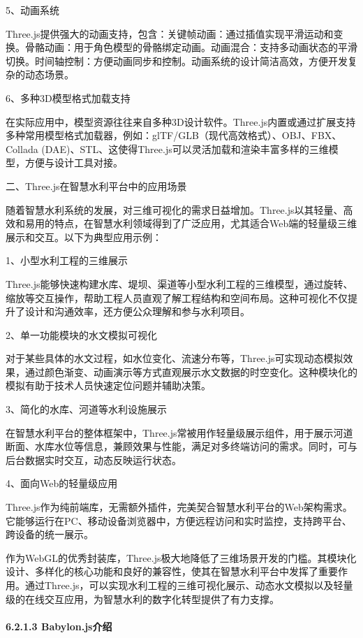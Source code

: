 5、动画系统

Three.js提供强大的动画支持，包含：关键帧动画：通过插值实现平滑运动和变换。骨骼动画：用于角色模型的骨骼绑定动画。动画混合：支持多动画状态的平滑切换。时间轴控制：方便动画同步和控制。动画系统的设计简洁高效，方便开发复杂的动态场景。

6、多种3D模型格式加载支持

在实际应用中，模型资源往往来自多种3D设计软件。Three.js内置或通过扩展支持多种常用模型格式加载器，例如：glTF/GLB（现代高效格式）、OBJ、FBX、Collada (DAE)、STL、这使得Three.js可以灵活加载和渲染丰富多样的三维模型，方便与设计工具对接。

二、Three.js在智慧水利平台中的应用场景

随着智慧水利系统的发展，对三维可视化的需求日益增加。Three.js以其轻量、高效和易用的特点，在智慧水利领域得到了广泛应用，尤其适合Web端的轻量级三维展示和交互。以下为典型应用示例：

1、小型水利工程的三维展示

Three.js能够快速构建水库、堤坝、渠道等小型水利工程的三维模型，通过旋转、缩放等交互操作，帮助工程人员直观了解工程结构和空间布局。这种可视化不仅提升了设计和沟通效率，还方便公众理解和参与水利项目。

2、单一功能模块的水文模拟可视化

对于某些具体的水文过程，如水位变化、流速分布等，Three.js可实现动态模拟效果，通过颜色渐变、动画演示等方式直观展示水文数据的时空变化。这种模块化的模拟有助于技术人员快速定位问题并辅助决策。

3、简化的水库、河道等水利设施展示

在智慧水利平台的整体框架中，Three.js常被用作轻量级展示组件，用于展示河道断面、水库水位等信息，兼顾效果与性能，满足对多终端访问的需求。同时，可与后台数据实时交互，动态反映运行状态。

4、面向Web的轻量级应用

Three.js作为纯前端库，无需额外插件，完美契合智慧水利平台的Web架构需求。它能够运行在PC、移动设备浏览器中，方便远程访问和实时监控，支持跨平台、跨设备的统一展示。

作为WebGL的优秀封装库，Three.js极大地降低了三维场景开发的门槛。其模块化设计、多样化的核心功能和良好的兼容性，使其在智慧水利平台中发挥了重要作用。通过Three.js，可以实现水利工程的三维可视化展示、动态水文模拟以及轻量级的在线交互应用，为智慧水利的数字化转型提供了有力支撑。

\hypertarget{babylon.jsux4ecbux7ecd}{%
\paragraph{6.2.1.3 Babylon.js介绍}\label{babylon.jsux4ecbux7ecd}}

